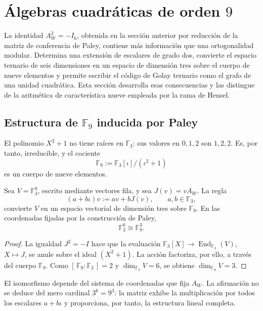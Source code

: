 \chapter{Álgebras cuadráticas de orden \(9\)}
\label{chap:algebras-cuadraticas-orden-nueve}

La identidad \(A_W^2=-I_6\), obtenida en la sección anterior por reducción
de la matriz de conferencia de Paley, contiene más información que una
ortogonalidad modular. Determina una extensión de escalares de grado dos,
convierte el espacio ternario de seis dimensiones en un espacio de dimensión
tres sobre el cuerpo de nueve elementos y permite escribir el código de
Golay ternario como el grafo de una unidad cuadrática. Esta sección desarrolla
esas consecuencias y las distingue de la aritmética de característica nueve
empleada por la rama de Hensel.

\section{Estructura de \texorpdfstring{\(\mathbb F_9\)}{F9} inducida por Paley}

El polinomio \(X^2+1\) no tiene raíces en \(\mathbb F_3\): sus valores en
\(0,1,2\) son \(1,2,2\). Es, por tanto, irreducible, y el cociente
\[
 \mathbb F_9
 :=\mathbb F_3[\iota]/(\iota^2+1)
\]
es un cuerpo de nueve elementos.

\begin{theorem}
\label{thm:f9-tres-desde-paley}
Sea \(V=\mathbb F_3^6\), escrito mediante vectores fila, y sea
\(J(v)=vA_W\). La regla
\[
 (a+b\iota)v:=av+bJ(v),
 \qquad a,b\in\mathbb F_3,
\]
convierte \(V\) en un espacio vectorial de dimensión tres sobre
\(\mathbb F_9\). En las coordenadas fijadas por la construcción de Paley,
\[
 \mathbb F_3^6\cong\mathbb F_9^3.
\]
\end{theorem}

\begin{proof}
La igualdad \(J^2=-I\) hace que la evaluación
\(\mathbb F_3[X]\to\operatorname{End}_{\mathbb F_3}(V)\), \(X\mapsto J\),
se anule sobre el ideal \((X^2+1)\). La acción factoriza, por ello, a través
del cuerpo \(\mathbb F_9\). Como
\([\,\mathbb F_9:\mathbb F_3\,]=2\) y
\(\dim_{\mathbb F_3}V=6\), se obtiene
\(\dim_{\mathbb F_9}V=3\).
\end{proof}

El isomorfismo depende del sistema de coordenadas que fija \(A_W\). La
afirmación no se deduce del mero cardinal \(3^6=9^3\): la matriz exhibe la
multiplicación por todos los escalares \(a+b\iota\) y proporciona, por
tanto, la estructura lineal completa.

